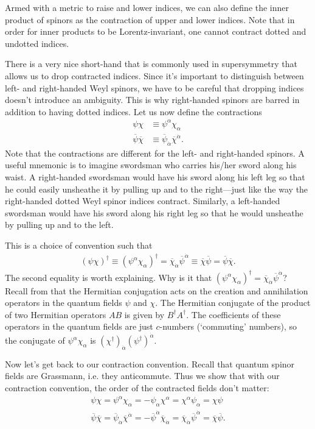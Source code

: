 \documentclass[12pt, oneside]{report}    %
\begin{document}
Armed with a metric to raise and lower indices, we can also define the inner product of spinors as the contraction of upper and lower indices. Note that in order for inner products to be Lorentz-invariant, one cannot contract dotted and undotted indices. 

There is a very nice short-hand that is commonly used in supersymmetry that allows us to drop contracted indices. Since it's important to distinguish between left- and right-handed Weyl spinors, we have to be careful that dropping indices doesn't introduce an ambiguity. This is why right-handed spinors are barred in addition to having dotted indices. Let us now define the contractions
\begin{align}
    \psi\chi &\equiv \psi^\alpha\chi_\alpha\label{eq:susyalg:undotted}\\
    \overline\psi\overline\chi &\equiv \overline\psi_{\dot\alpha}\overline\chi^{\dot\alpha}\label{eq:susyalg:dot}.
\end{align}
Note that the contractions are different for the left- and right-handed spinors. A useful mnemonic is to imagine swordsman who carries his/her sword along his waist. A right-handed swordsman would have his sword along his left leg so that he could easily unsheathe it by pulling up and to the right---just like the way the right-handed dotted Weyl spinor indices contract. Similarly, a left-handed swordsman would have his sword along his right leg so that he would unsheathe by pulling up and to the left.

This is a choice of convention such that
\begin{align}
    (\psi\chi)^\dag \equiv (\psi^\alpha\chi_\alpha)^\dag = \overline\chi_{\dot\alpha}\overline\psi^{\dot\alpha} \equiv \overline\chi\overline\psi = \overline\psi\overline\chi.
\end{align}
The second equality is worth explaining. Why is it that $(\psi^\alpha\chi_\alpha)^\dag = \overline\chi_{\dot\alpha}\overline\psi^{\dot\alpha}$? Recall from that the Hermitian conjugation acts on the creation and annihilation operators in the quantum fields $\psi$ and $\chi$. The Hermitian conjugate of the product of two Hermitian operators $AB$ is given by $B^\dag A^\dag$. The coefficients of these operators in the quantum fields are just $c$-numbers (`commuting' numbers), so the conjugate of $\psi^\alpha\chi_\alpha$ is $\left(\chi^\dag\right)_{\dot\alpha}\left(\psi^\dag\right)^{\dot\alpha}$.

Now let's get back to our contraction convention. Recall that quantum spinor fields are Grassmann, i.e. they anticommute. Thus we show that with our contraction convention, the order of the contracted fields don't matter:
\begin{align}
    \psi\chi = \psi^\alpha\chi_\alpha = -\psi_\alpha\chi^\alpha = \chi^\alpha\psi_\alpha = \chi\psi\label{eq:SUSYalg:contractions}\\
    \overline\psi\overline\chi = \overline\psi_{\dot\alpha}\overline\chi^{\dot\alpha}= -\overline\psi^{\dot\alpha}\overline\chi_{\dot\alpha} = \overline\chi_{\dot\alpha}\overline\psi^{\dot\alpha}=\overline\chi\overline\psi.\label{eq:SUSYalg:overlinecontractions}
\end{align} 
\end{document}
